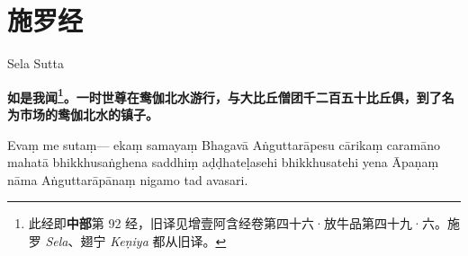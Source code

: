 \section{施罗经}

\begin{center}Sela Sutta\end{center}\vspace{1em}

\textbf{如是我闻\footnote{此经即\textbf{中部}第 92 经，旧译见增壹阿含经卷第四十六·放牛品第四十九·六。施罗 \textit{Sela}、翅宁 \textit{Keṇiya} 都从旧译。}。一时世尊在鸯伽北水游行，与大比丘僧团千二百五十比丘俱，到了名为市场的鸯伽北水的镇子。}

Evaṃ me sutaṃ— ekaṃ samayaṃ Bhagavā Aṅguttarāpesu cārikaṃ caramāno mahatā bhikkhusaṅghena saddhiṃ aḍḍhateḷasehi bhikkhusatehi yena Āpaṇaṃ nāma Aṅguttarāpānaṃ nigamo tad avasari.

